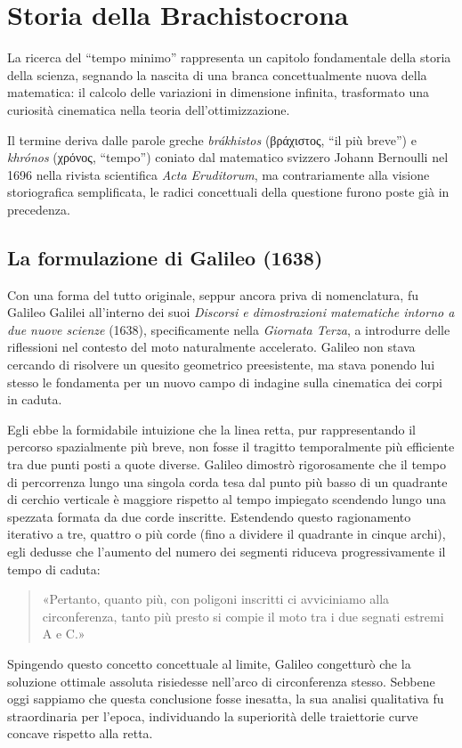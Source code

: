 \documentclass[a4paper,12pt]{article} %
\begin{document}
\section{Storia della Brachistocrona}

La ricerca del ``tempo minimo'' rappresenta un capitolo fondamentale della storia della scienza, segnando la nascita di una branca concettualmente nuova della matematica: il calcolo delle variazioni in dimensione infinita, trasformato una curiosità cinematica nella teoria dell'ottimizzazione.

Il termine deriva dalle parole greche \textit{brákhistos} (\foreignlanguage{greek}{βράχιστος}, ``il più breve'') e \textit{khrónos} (\foreignlanguage{greek}{χρόνος}, ``tempo'') coniato dal matematico svizzero Johann Bernoulli nel 1696 nella rivista scientifica \textit{Acta Eruditorum}, ma contrariamente alla visione storiografica semplificata, le radici concettuali della questione furono poste già in precedenza.

\subsection{La formulazione di Galileo (1638)}

Con una forma del tutto originale, seppur ancora priva di nomenclatura, fu Galileo Galilei all'interno dei suoi \textit{Discorsi e dimostrazioni matematiche intorno a due nuove scienze} (1638), specificamente nella \textit{Giornata Terza}, a introdurre delle riflessioni nel contesto del moto naturalmente accelerato. Galileo non stava cercando di risolvere un quesito geometrico preesistente, ma stava ponendo lui stesso le fondamenta per un nuovo campo di indagine sulla cinematica dei corpi in caduta.

Egli ebbe la formidabile intuizione che la linea retta, pur rappresentando il percorso spazialmente più breve, non fosse il tragitto temporalmente più efficiente tra due punti posti a quote diverse. Galileo dimostrò rigorosamente che il tempo di percorrenza lungo una singola corda tesa dal punto più basso di un quadrante di cerchio verticale è maggiore rispetto al tempo impiegato scendendo lungo una spezzata formata da due corde inscritte. Estendendo questo ragionamento iterativo a tre, quattro o più corde (fino a dividere il quadrante in cinque archi), egli dedusse che l'aumento del numero dei segmenti riduceva progressivamente il tempo di caduta:
\begin{quote}
    «Pertanto, quanto più, con poligoni inscritti ci avviciniamo alla circonferenza, tanto più presto si compie il moto tra i due segnati estremi A e C.»
\end{quote}
Spingendo questo concetto concettuale al limite, Galileo congetturò che la soluzione ottimale assoluta risiedesse nell'arco di circonferenza stesso. Sebbene oggi sappiamo che questa conclusione fosse inesatta, la sua analisi qualitativa fu straordinaria per l'epoca,  individuando la superiorità delle traiettorie curve concave rispetto alla retta. 
\end{document}
